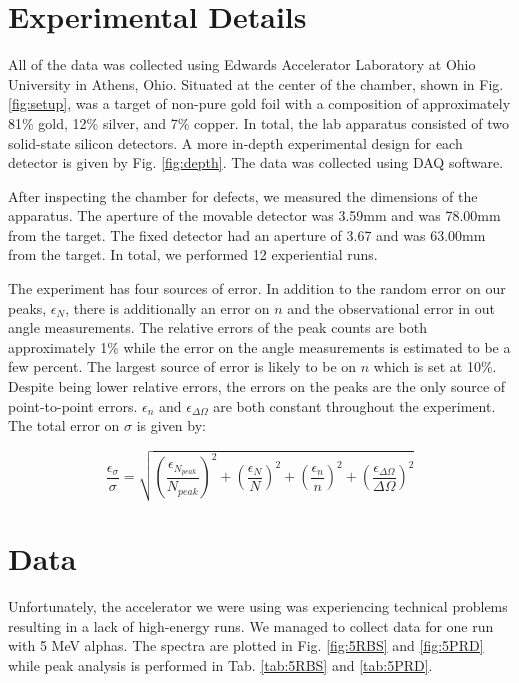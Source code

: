 \documentclass[10pt]{IEEEtran}
\begin{document}
\section{Experimental Details}
All of the data was collected using Edwards Accelerator Laboratory at Ohio University in Athens, Ohio. Situated at the center of the chamber, shown in Fig. \ref{fig:setup}, was a target of non-pure gold foil with a composition of approximately 81\% gold, 12\% silver, and 7\% copper. In total, the lab apparatus consisted of two solid-state silicon detectors. A more in-depth experimental design for each detector is given by Fig. \ref{fig:depth}. The data was collected using DAQ software.

After inspecting the chamber for defects, we measured the dimensions of the apparatus. The aperture of the movable detector was 3.59mm and was 78.00mm from the target. The fixed detector had an aperture of 3.67 and was 63.00mm from the target. In total, we performed 12 experiential runs.

The experiment has four sources of error. In addition to the random error on our peaks, $\epsilon_N$, there is additionally an error on $n$ and the observational error in out angle measurements. The relative errors of the peak counts are both approximately 1\% while the error on the angle measurements is estimated to be a few percent. The largest source of error is likely to be on $n$ which is set at 10\%. Despite being lower relative errors, the errors on the peaks are the only source of point-to-point errors. $\epsilon_n$ and $\epsilon_{\Delta\Omega}$ are both constant throughout the experiment. The total error on $\sigma$ is given by: 

\begin{equation}
\frac{\epsilon_\sigma}{\sigma} = \sqrt{\left(\frac{\epsilon_{N_{peak}}}{N_{peak}}\right)^2+\left(\frac{\epsilon_{N}}{N}\right)^2+\left(\frac{\epsilon_{n}}{n}\right)^2+\left(\frac{\epsilon_{\Delta\Omega}}{\Delta\Omega}\right)^2}
\end{equation}

\section{Data}    

Unfortunately, the accelerator we were using was experiencing technical problems resulting in a lack of high-energy runs. We managed to collect data for one run with 5 MeV alphas. The spectra are plotted in Fig. \ref{fig:5RBS} and \ref{fig:5PRD} while peak analysis is performed in Tab. \ref{tab:5RBS} and \ref{tab:5PRD}.
\end{document}
